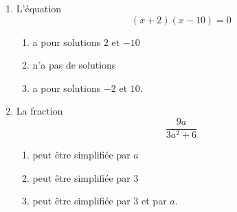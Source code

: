 \begin{exercice}[\ldots/4]
\begin{multicols}{2}
\begin{enumerate}
\item

    L'équation
    \begin{equation*}
        (x+2)(x-10)=0
    \end{equation*}
    \begin{enumerate}
        \item
            a pour solutions \( 2\) et \( -10\)
        \item
            n'a pas de solutions
        \item
            a pour solutions \( -2\) et \( 10\).
    \end{enumerate}
    
\item

    La fraction
    \begin{equation*}
        \frac{ 9a }{ 3a^2+6 }
    \end{equation*}
    
    \begin{enumerate}
        \item
            peut être simplifiée par \( a\)
        \item
            peut être simplifiée par \( 3\)
        \item
            peut être simplifiée par \( 3\) et par \( a\).
    \end{enumerate}

    \end{enumerate}
    \end{multicols}

\end{exercice}
